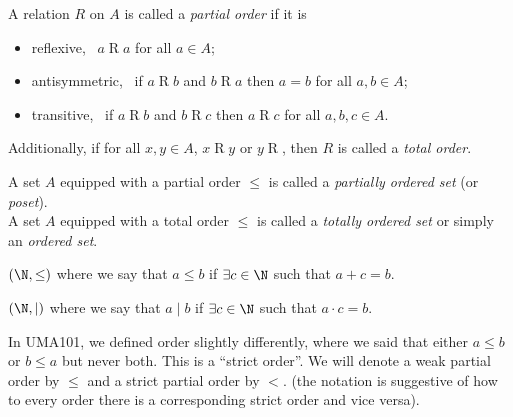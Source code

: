 \begin{definition} \label{def:relations:partial_order}
    A relation $R$ on $A$ is called a \emph{partial order} if it is
    \begin{itemize}
        \item reflexive, \ie\ $a \mathrel{R} a$ for all $a \in A$;
        \item antisymmetric, \ie\ if $a \mathrel{R} b$ and $b \mathrel{R} a$
        then $a = b$ for all $a, b \in A$;
        \item transitive, \ie\ if $a \mathrel{R} b$ and $b \mathrel{R} c$ then
        $a \mathrel{R} c$ for all $a, b, c \in A$.
    \end{itemize}
    Additionally, if for all $x, y \in A$, $x \mathrel{R} y$ or $y \mathrel{R}$,
    then $R$ is called a \emph{total order}.

    A set $A$ equipped with a partial order $\le$ is called a \emph{partially
    ordered set} (or \emph{poset}). \\
    A set $A$ equipped with a total order $\le$ is called a \emph{totally
    ordered set} or simply an \emph{ordered set}.
\end{definition}
\begin{examples}
    \item $(\N, \le)$ where we say that $a \le b$ if $\exists c \in \N$ such
    that $a + c = b$.
    \item $(\N, \mid)$ where we say that $a \mid b$ if $\exists c \in \N$ such
    that $a \cdot c = b$.
\end{examples}

In UMA101, we defined order slightly differently, where we said that either
$a \le b$ or $b \le a$ but never both.
This is a ``strict order''.
We will denote a weak partial order by $\le$ and a strict partial order by $<$.
(the notation is suggestive of how to every order there is a corresponding
strict order and vice versa).

